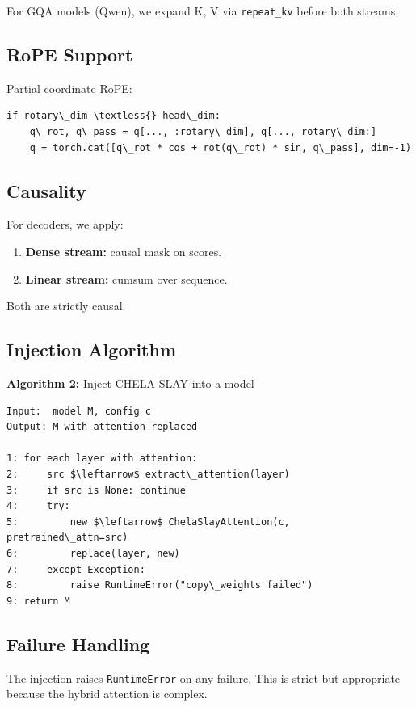 For GQA models (Qwen), we expand K, V via \texttt{repeat\_kv} before both streams.

\subsection{RoPE Support}

Partial-coordinate RoPE:

\begin{lstlisting}
if rotary\_dim \textless{} head\_dim:
    q\_rot, q\_pass = q[..., :rotary\_dim], q[..., rotary\_dim:]
    q = torch.cat([q\_rot * cos + rot(q\_rot) * sin, q\_pass], dim=-1)
\end{lstlisting}

\subsection{Causality}

For decoders, we apply:

\begin{enumerate}
\item \textbf{Dense stream:} causal mask on scores.
\item \textbf{Linear stream:} cumsum over sequence.

\end{enumerate}
Both are strictly causal.

\subsection{Injection Algorithm}

\textbf{Algorithm 2:} Inject CHELA-SLAY into a model
\begin{lstlisting}
Input:  model M, config c
Output: M with attention replaced

1: for each layer with attention:
2:     src $\leftarrow$ extract\_attention(layer)
3:     if src is None: continue
4:     try:
5:         new $\leftarrow$ ChelaSlayAttention(c, pretrained\_attn=src)
6:         replace(layer, new)
7:     except Exception:
8:         raise RuntimeError("copy\_weights failed")
9: return M
\end{lstlisting}

\subsection{Failure Handling}

The injection raises \texttt{RuntimeError} on any failure. This is strict but 
appropriate because the hybrid attention is complex.

